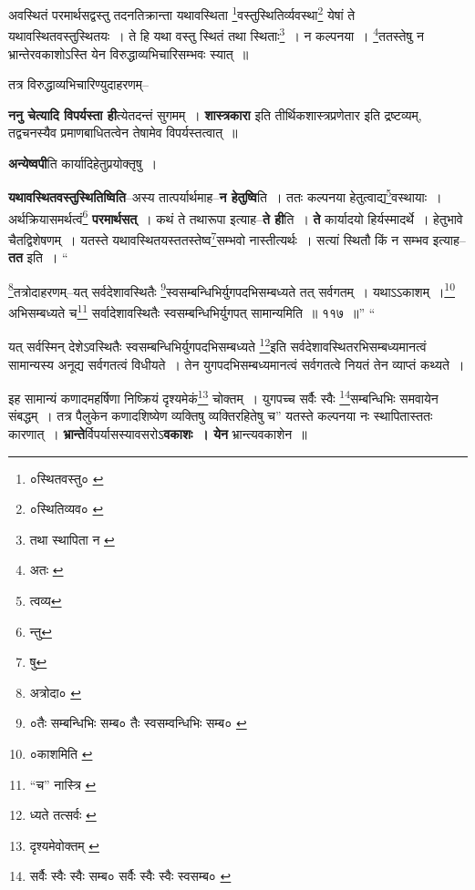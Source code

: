 \documentclass[article,12pt,a4paper]{memoir}
\begin{document}
	  \pstart अवस्थितं परमार्थसद्वस्तु तदनतिक्रान्ता यथावस्थिता \footnote{०स्थितवस्तु० \cite{dp-msC}}वस्तुस्थितिर्व्यवस्था\footnote{०स्थितिव्यव० \cite{dp-msA} \cite{dp-msB} \cite{dp-edP} \cite{dp-edH} \cite{dp-edE}} येषां ते यथावस्थितवस्तुस्थितयः । ते हि यथा वस्तु स्थितं तथा स्थिताः\footnote{तथा स्थापिता न \cite{dp-msC} \cite{dp-msD}} । न कल्पनया । \footnote{अतः \cite{dp-msA} \cite{dp-msB} \cite{dp-edP} \cite{dp-edH} \cite{dp-edE} \cite{dp-edN}}ततस्तेषु न भ्रान्तेरवकाशोऽस्ति येन विरुद्धाव्यभिचारिसम्भवः स्यात् ॥
	\pend
       

	  \pstart तत्र विरुद्धाव्यभिचारिण्युदाहरणम्--
	\pend
      
	  \endgroup
	

	  \pstart \textbf{ननु चेत्यादि विपर्यस्ता ही}त्येतदन्तं सुगमम् । \textbf{शास्त्रकारा} इति तीर्थिकशास्त्रप्रणेतार इति द्रष्टव्यम्, तद्वचनस्यैव प्रमाणबाधितत्वेन तेषामेव विपर्यस्तत्वात् ॥
	\pend
      

	  \pstart \textbf{अन्येष्वपी}ति कार्यादिहेतुप्रयोक्तृषु ।
	\pend
      

	  \pstart \textbf{यथावस्थितवस्तुस्थितिष्विति}--अस्य तात्पर्यार्थमाह--\textbf{न हेतुष्वि}ति । ततः कल्पनया हेतुत्वाद्य\footnote{त्वव्य}वस्थायाः । अर्थक्रियासमर्थत्वं\footnote{न्तु} \textbf{परमार्थसत्} । कथं ते तथारूपा इत्याह--\textbf{ते ही}ति । \textbf{ते} कार्यादयो हिर्यस्मादर्थे । हेतुभावे चैतद्विशेषणम् । यतस्ते यथावस्थितयस्ततस्तेष्व\footnote{षु}सम्भवो नास्तीत्यर्थः । सत्यां स्थितौ किं न सम्भव इत्याह--\textbf{तत} इति ।    \leavevmode{} “
	  
	\footnote{अत्रोदा० \cite{dp-edE}}तत्रोदाहरणम्--यत् सर्वदेशावस्थितैः \footnote{०तैः सम्बन्धिभिः सम्ब० \cite{dp-msC} तैः स्वसम्वन्धिभिः सम्ब० \cite{dp-msB} \cite{dp-edP} \cite{dp-edH} \cite{dp-edN}}स्वसम्बन्धिभिर्युगपदभिसम्बध्यते तत् सर्वगतम् । यथाऽऽकाशम् ।\footnote{०काशमिति \cite{dp-msC}} अभिसम्बध्यते च\footnote{“च” नास्त्रि \cite{dp-msB} \cite{dp-edP} \cite{dp-edH} \cite{dp-edE}} सर्वादेशावस्थितैः स्वसम्बन्धिभिर्युगपत् सामान्यमिति ॥ ११७ ॥” “
	  
	यत् सर्वस्मिन् देशेऽवस्थितैः स्वसम्बन्धिभिर्युगपदभिसम्बध्यते \footnote{ध्यते तत्सर्वः \cite{dp-msA} \cite{dp-msB} \cite{dp-edP} \cite{dp-edH} \cite{dp-edE} \cite{dp-edN}}इति सर्वदेशावस्थितरभिसम्बध्यमानत्वं सामान्यस्य अनूद्य सर्वगतत्वं विधीयते । तेन युगपदभिसम्बध्यमानत्वं सर्वगतत्वे नियतं तेन व्याप्तं कथ्यते । 
	  
	इह सामान्यं कणादमहर्षिणा निष्क्रियं दृश्यमेकं\footnote{दृश्यमेवोक्तम् \cite{dp-msB}} चोक्तम् । युगपच्च सर्वैः स्वैः \footnote{सर्वैः स्वैः स्वैः सम्ब० \cite{dp-msA} \cite{dp-edP} \cite{dp-edH} \cite{dp-edE} \cite{dp-edN} सर्वैः स्वैः स्वैः स्वसम्ब० \cite{dp-msB}}सम्बन्धिभिः समवायेन संबद्धम् । तत्र पैलुकेन कणादशिष्येण व्यक्तिषु व्यक्तिरहितेषु च” यतस्ते कल्पनया नः स्थापितास्ततः कारणात् । \textbf{भ्रान्ते}र्विपर्यासस्यावसरोऽ\textbf{वकाशः । येन} भ्रान्त्यवकाशेन ॥
	\pend
      
\end{document}
